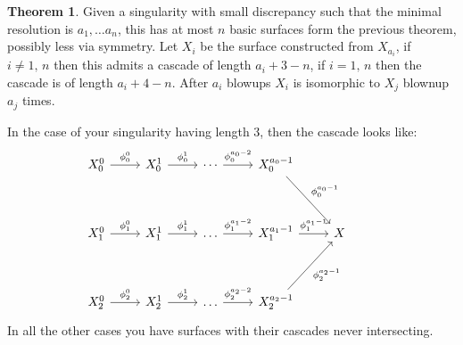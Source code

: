 \documentclass[11pt]{amsbook}
\theoremstyle{definition}
\newtheorem{thm}{Theorem}[section]
\theoremstyle{definition}
\theoremstyle{definition}
\theoremstyle{definition}
\theoremstyle{definition}
\theoremstyle{definition}
\theoremstyle{definition}
\theoremstyle{definition}
\begin{document}
\begin{thm}
Given a singularity with small discrepancy such that the minimal resolution is $a_1, \dots a_n$, this has at most $n$ basic surfaces form the previous theorem, possibly less via symmetry. Let $X_i$ be the surface constructed from $X_{a_i}$, if $i \neq 1,\, n$ then this admits a cascade of length $a_i + 3 - n$, if $i = 1, \, n$ then the cascade is of length $a_i + 4 - n$.  After $a_i$ blowups $X_{i}$ is isomorphic to $X_j$ blownup $a_j$ times.


In the case of your singularity having length 3, then the cascade looks like:
\[
\begin{tikzcd}
X_{0}^0 \arrow[r, "\phi_{0}^0"] & X_{0}^1 \arrow[r, "\phi_{0}^1"] & \cdots \arrow[r, "\phi_{0}^{a_0-2}"] & X_{0}^{a_0-1} \arrow[rdd, "\phi_{0}^{a_0-1}"]  &                       &     \\
\\
X_{1}^0 \arrow[r, "\phi_{1}^0"] & X_{1}^1 \arrow[r, "\phi_{1}^1"] & \dots \arrow[r, "\phi_{1}^{a_1-2}"]  & X_{1}^{a_1-1} \arrow[r, "\phi_{1}^{a_1 -1}"]   & X \\
\\
X_{2}^0 \arrow[r, "\phi_{2}^0"] & X_{2}^1 \arrow[r, "\phi_{2}^1"] & \dots \arrow[r, "\phi_{2}^{a_2-2}"]  & X_{2}^{a_2-1} \arrow[ruu, "\phi_{2}^{a_2-1}"'] &                       &    
\end{tikzcd}
\]
In all the other cases you have surfaces with their cascades never intersecting. 
\end{thm}
\end{document}

